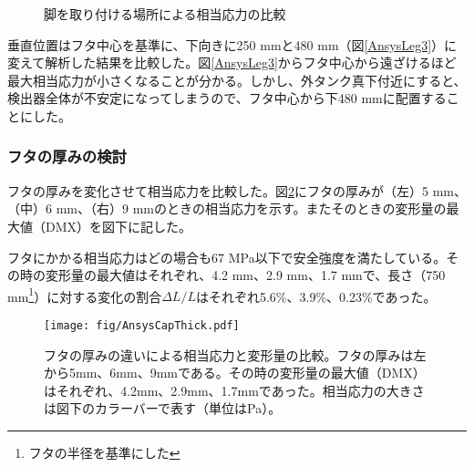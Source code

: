 \documentclass[11pt]{ltjsreport}
\newcommand{\figref}[1]{図\ref{#1}}
\begin{document}
\begin{figure}[htbp]
  \begin{minipage}{1\textwidth}
  \end{minipage}
  \hfill
  \begin{minipage}{0.47\textwidth}
  \end{minipage}
  \hfill
  \begin{minipage}{0.47\textwidth}
  \end{minipage}
    \caption{脚を取り付ける場所による相当応力の比較}
  \label{AnsysLeg}
\end{figure}
\fi%

垂直位置はフタ中心を基準に、下向きに250 mmと480 mm（\figref{AnsysLeg3}）に変えて解析した結果を比較した。\figref{AnsysLeg3}からフタ中心から遠ざけるほど最大相当応力が小さくなることが分かる。しかし、外タンク真下付近にすると、検出器全体が不安定になってしまうので、フタ中心から下480 mmに配置することにした。


\subsubsection{フタの厚みの検討}
フタの厚みを変化させて相当応力を比較した。\figref{AnsysCapThick}にフタの厚みが（左）5 mm、（中）6 mm、（右）9 mmのときの相当応力を示す。またそのときの変形量の最大値（DMX）を図下に記した。

フタにかかる相当応力はどの場合も67 MPa以下で安全強度を満たしている。その時の変形量の最大値はそれぞれ、4.2 mm、2.9 mm、1.7 mmで、長さ（750 mm\footnote{フタの半径を基準にした}）に対する変化の割合$\Delta L/L$はそれぞれ5.6\%、3.9\%、0.23\%であった。

\begin{figure}[htbp]
\centering
\texttt{[image: fig/AnsysCapThick.pdf]}
\caption[フタの厚みの違いによる相当応力と変形量の比較]{フタの厚みの違いによる相当応力と変形量の比較。フタの厚みは左から5mm、6mm、9mmである。その時の変形量の最大値（DMX）はそれぞれ、4.2mm、2.9mm、1.7mmであった。相当応力の大きさは図下のカラーバーで表す（単位はPa）。}
\label{AnsysCapThick}
\end{figure}
\end{document}
